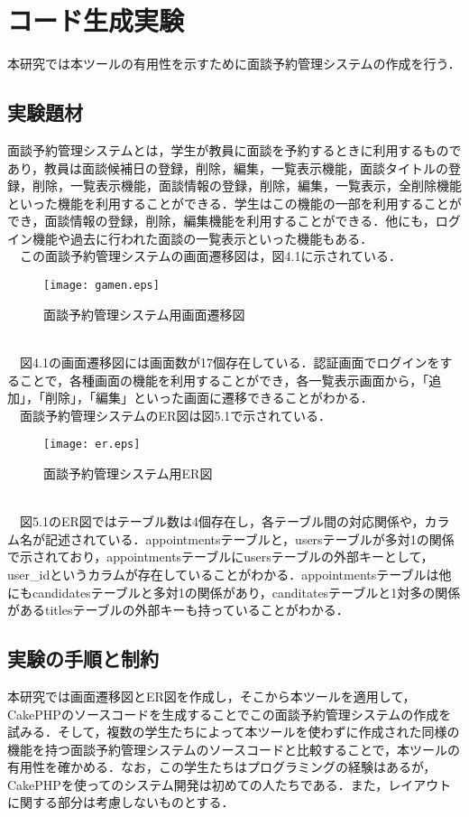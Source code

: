 \documentclass{funthesis}
\begin{document}
\chapter{コード生成実験}
本研究では本ツールの有用性を示すために面談予約管理システムの作成を行う．

\section{実験題材}
面談予約管理システムとは，学生が教員に面談を予約するときに利用するものであり，教員は面談候補日の登録，削除，編集，一覧表示機能，面談タイトルの登録，削除，一覧表示機能，面談情報の登録，削除，編集，一覧表示，全削除機能といった機能を利用することができる．学生はこの機能の一部を利用することができ，面談情報の登録，削除，編集機能を利用することができる．他にも，ログイン機能や過去に行われた面談の一覧表示といった機能もある．\\
　この面談予約管理システムの画面遷移図は，図4.1に示されている．
\begin{figure*}[htpb]
\begin{center}
\texttt{[image: gamen.eps]}
\caption{面談予約管理システム用画面遷移図}
\end{center}
\end{figure*}
\\
　図4.1の画面遷移図には画面数が17個存在している．認証画面でログインをすることで，各種画面の機能を利用することができ，各一覧表示画面から，「追加」，「削除」，「編集」といった画面に遷移できることがわかる．\\
　面談予約管理システムのER図は図5.1で示されている．
\begin{figure*}[h]
\begin{center}
\texttt{[image: er.eps]}
\caption{面談予約管理システム用ER図}
\end{center}
\end{figure*}
\\
　図5.1のER図ではテーブル数は4個存在し，各テーブル間の対応関係や，カラム名が記述されている．appointmentsテーブルと，usersテーブルが多対1の関係で示されており，appointmentsテーブルにusersテーブルの外部キーとして，user\_idというカラムが存在していることがわかる．appointmentsテーブルは他にもcandidatesテーブルと多対1の関係があり，canditatesテーブルと1対多の関係があるtitlesテーブルの外部キーも持っていることがわかる．


\section{実験の手順と制約}
本研究では画面遷移図とER図を作成し，そこから本ツールを適用して，CakePHPのソースコードを生成することでこの面談予約管理システムの作成を試みる．そして，複数の学生たちによって本ツールを使わずに作成された同様の機能を持つ面談予約管理システムのソースコードと比較することで，本ツールの有用性を確かめる．なお，この学生たちはプログラミングの経験はあるが，CakePHPを使ってのシステム開発は初めての人たちである．また，レイアウトに関する部分は考慮しないものとする．
\end{document}
